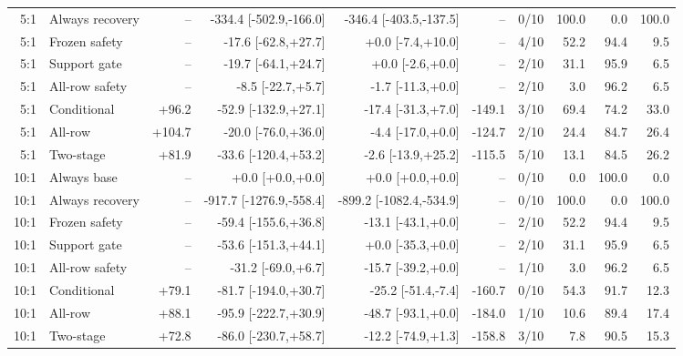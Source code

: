 \begin{tabular}{rlrrrrrrrr}
5:1 & Always recovery & -- & -334.4 [-502.9,-166.0] & -346.4 [-403.5,-137.5] & -- & 0/10 & 100.0 & 0.0 & 100.0 \\
5:1 & Frozen safety & -- & -17.6 [-62.8,+27.7] & +0.0 [-7.4,+10.0] & -- & 4/10 & 52.2 & 94.4 & 9.5 \\
5:1 & Support gate & -- & -19.7 [-64.1,+24.7] & +0.0 [-2.6,+0.0] & -- & 2/10 & 31.1 & 95.9 & 6.5 \\
5:1 & All-row safety & -- & -8.5 [-22.7,+5.7] & -1.7 [-11.3,+0.0] & -- & 2/10 & 3.0 & 96.2 & 6.5 \\
5:1 & Conditional & +96.2 & -52.9 [-132.9,+27.1] & -17.4 [-31.3,+7.0] & -149.1 & 3/10 & 69.4 & 74.2 & 33.0 \\
5:1 & All-row & +104.7 & -20.0 [-76.0,+36.0] & -4.4 [-17.0,+0.0] & -124.7 & 2/10 & 24.4 & 84.7 & 26.4 \\
5:1 & Two-stage & +81.9 & -33.6 [-120.4,+53.2] & -2.6 [-13.9,+25.2] & -115.5 & 5/10 & 13.1 & 84.5 & 26.2 \\
10:1 & Always base & -- & +0.0 [+0.0,+0.0] & +0.0 [+0.0,+0.0] & -- & 0/10 & 0.0 & 100.0 & 0.0 \\
10:1 & Always recovery & -- & -917.7 [-1276.9,-558.4] & -899.2 [-1082.4,-534.9] & -- & 0/10 & 100.0 & 0.0 & 100.0 \\
10:1 & Frozen safety & -- & -59.4 [-155.6,+36.8] & -13.1 [-43.1,+0.0] & -- & 2/10 & 52.2 & 94.4 & 9.5 \\
10:1 & Support gate & -- & -53.6 [-151.3,+44.1] & +0.0 [-35.3,+0.0] & -- & 2/10 & 31.1 & 95.9 & 6.5 \\
10:1 & All-row safety & -- & -31.2 [-69.0,+6.7] & -15.7 [-39.2,+0.0] & -- & 1/10 & 3.0 & 96.2 & 6.5 \\
10:1 & Conditional & +79.1 & -81.7 [-194.0,+30.7] & -25.2 [-51.4,-7.4] & -160.7 & 0/10 & 54.3 & 91.7 & 12.3 \\
10:1 & All-row & +88.1 & -95.9 [-222.7,+30.9] & -48.7 [-93.1,+0.0] & -184.0 & 1/10 & 10.6 & 89.4 & 17.4 \\
10:1 & Two-stage & +72.8 & -86.0 [-230.7,+58.7] & -12.2 [-74.9,+1.3] & -158.8 & 3/10 & 7.8 & 90.5 & 15.3 \\
\bottomrule
\end{tabular}

